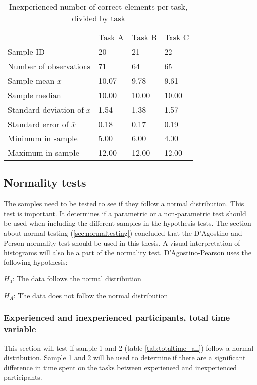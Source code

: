 \begin{table}[H]
	\centering
	\begin{tabular}{l|l|l|l}
		 & Task A & Task B & Task C \\ 
		Sample ID & 20 & 21 & 22 \\ \hline
		Number of observations & 71 & 64  & 65 \\
		Sample mean $\overline{x}$  & 10.07  &  9.78 &  9.61  \\
		Sample median  & 10.00  & 10.00  &  10.00  \\
		Standard deviation of $\overline{x}$  & 1.54  & 1.38  & 1.57   \\
		Standard error of $\overline{x}$  & 0.18 & 0.17 & 0.19  \\
		Minimum in sample  & 5.00 & 6.00 &  4.00  \\
		Maximum in sample  & 12.00 & 12.00  & 12.00 \\ \hline
	\end{tabular}
	\caption[Correct elements, inexperienced per task]{Inexperienced number of correct elements per task, divided by task}
	\label{tab:totalcorrect_tasks_inexperienced}
\end{table}
\vspace{0.5cm}

\subsection{Normality tests}\label{sec:normality_results}
The samples need to be tested to see if they follow a normal distribution. This test is important. It determines if a parametric or a non-parametric test should be used when including the different samples in the hypothesis tests. The section about normal testing (\ref{sec:normaltesting}) concluded that the D'Agostino and Person normality test should be used in this thesis. A visual interpretation of histograms will also be a part of the normality test. D'Agostino-Pearson uses the following hypothesis:\newline

\centerline{$H_{0}$: The data follows the normal distribution} 
\centerline{$H_{A}$: The data does not follow the normal distribution}


\subsubsection[Sample 1 and 2]{Experienced and inexperienced participants, total time variable}\label{sec:sample1,2_normresult}
This section will test if sample 1 and 2 (table \ref{tab:totaltime_all}) follow a normal distribution. Sample 1 and 2 will be used to determine if there are a significant difference in time spent on the tasks between experienced and inexperienced participants. 

